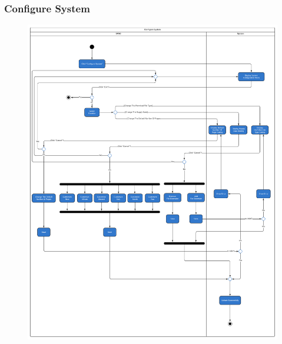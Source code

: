     \subsubsection{Configure System}
    \begin{center}
    \begin{figure}[!htp]
    \begin{center}
     \includegraphics[scale=.4]{images/Task2/ActivityDiagrams/ConfigureSystem.pdf}
    \end{center}
    \label{refhinh1}
    \end{figure}
    \end{center}

